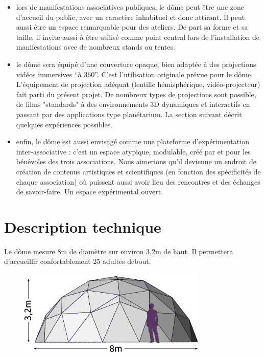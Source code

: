 \documentclass[a4paper,12pt]{report}
\begin{document}
\begin{itemize}

	\item lors de manifestations associatives publiques, le dôme peut être une
	zone d'accueil du public, avec un caractère inhabituel et donc attirant. Il
	peut aussi être un espace remarquable pour des ateliers. De part sa forme
	et sa taille, il invite aussi à être utilisé comme point central lors de
	l'installation de manifestations avec de nombreux stands ou tentes.

	\item le dôme sera équipé d'une couverture opaque, bien adaptée à des
	projections vidéos immersives ``à 360''. C'est l'utilisation originale
	prévue pour le dôme. L'équipement de projection adéquat (lentille
	hémisphérique, vidéo-projecteur) fait parti du présent projet.  De nombreux
	types de projections sont possible, de films "standards" à des
	environnements 3D dynamiques et interactifs en passant par des applications
	type planétarium. La section suivant décrit quelques expériences possibles.

	\item enfin, le dôme est aussi envisagé comme une plateforme
	d'expérimentation inter-associative : c'est un espace atypique, modulable,
	créé par et pour les bénévoles des trois associations.  Nous aimerions
	qu'il devienne un endroit de création de contenus artistiques et
	scientifiques (en fonction des spécificités de chaque association) où
	puissent aussi avoir lieu des rencontres et des échanges de savoir-faire.
	Un espace expérimental ouvert.

\end{itemize}


\chapter{Description technique}

Le dôme mesure 8m de diamètre sur environ 3,2m de haut. Il permettera
d'accueillir confortablement 25 adultes debout.

\begin{figure}[!h]
\centering
\includegraphics[width=9cm]{dimensions.pdf}
\end{figure}
\end{document}
